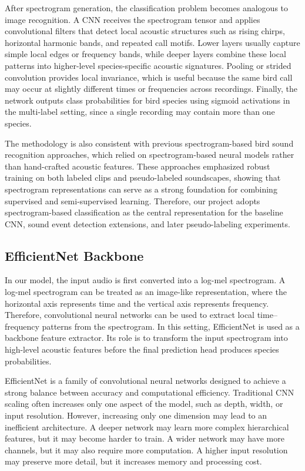 \documentclass[a4paper,12pt]{article}
\begin{document}
After spectrogram generation, the classification problem becomes analogous to image recognition. A CNN receives the spectrogram tensor and applies convolutional filters that detect local acoustic structures such as rising chirps, horizontal harmonic bands, and repeated call motifs. Lower layers usually capture simple local edges or frequency bands, while deeper layers combine these local patterns into higher-level species-specific acoustic signatures. Pooling or strided convolution provides local invariance, which is useful because the same bird call may occur at slightly different times or frequencies across recordings. Finally, the network outputs class probabilities for bird species using sigmoid activations in the multi-label setting, since a single recording may contain more than one species.

The methodology is also consistent with previous spectrogram-based bird sound recognition approaches, which relied on spectrogram-based neural models rather than hand-crafted acoustic features. These approaches emphasized robust training on both labeled clips and pseudo-labeled soundscapes, showing that spectrogram representations can serve as a strong foundation for combining supervised and semi-supervised learning. Therefore, our project adopts spectrogram-based classification as the central representation for the baseline CNN, sound event detection extensions, and later pseudo-labeling experiments.

\subsection{EfficientNet Backbone}

In our model, the input audio is first converted into a log-mel spectrogram. A log-mel spectrogram can be treated as an image-like representation, where the horizontal axis represents time and the vertical axis represents frequency. Therefore, convolutional neural networks can be used to extract local time--frequency patterns from the spectrogram. In this setting, EfficientNet is used as a backbone feature extractor. Its role is to transform the input spectrogram into high-level acoustic features before the final prediction head produces species probabilities.

EfficientNet is a family of convolutional neural networks designed to achieve a strong balance between accuracy and computational efficiency. Traditional CNN scaling often increases only one aspect of the model, such as depth, width, or input resolution. However, increasing only one dimension may lead to an inefficient architecture. A deeper network may learn more complex hierarchical features, but it may become harder to train. A wider network may have more channels, but it may also require more computation. A higher input resolution may preserve more detail, but it increases memory and processing cost.
\end{document}
